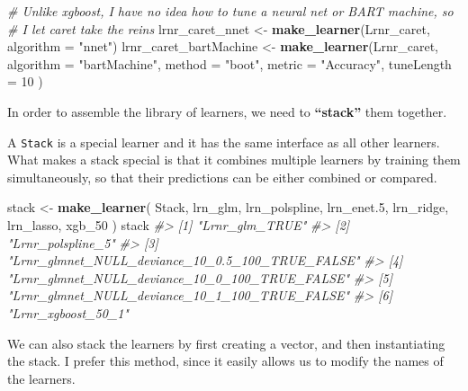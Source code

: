 \documentclass[12pt, krantz2,]{krantz}
\newenvironment{Shaded}{\begin{snugshade}}{\end{snugshade}}
\newcommand{\CommentTok}[1]{\textcolor[rgb]{0.37,0.37,0.37}{\textit{#1}}}
\newcommand{\DataTypeTok}[1]{\textcolor[rgb]{0.27,0.27,0.27}{#1}}
\newcommand{\DecValTok}[1]{\textcolor[rgb]{0.06,0.06,0.06}{#1}}
\newcommand{\FloatTok}[1]{\textcolor[rgb]{0.06,0.06,0.06}{#1}}
\newcommand{\KeywordTok}[1]{\textcolor[rgb]{0.27,0.27,0.27}{\textbf{#1}}}
\newcommand{\NormalTok}[1]{#1}
\newcommand{\StringTok}[1]{\textcolor[rgb]{0.5,0.5,0.5}{#1}}
\theoremstyle{definition}
\theoremstyle{definition}
\theoremstyle{definition}
\newcommand{\1}{\mathbbm{1}}
\begin{document}
\begin{Shaded}
\begin{Highlighting}[]
\CommentTok{# Unlike xgboost, I have no idea how to tune a neural net or BART machine, so}
\CommentTok{# I let caret take the reins}
\NormalTok{lrnr_caret_nnet <-}\StringTok{ }\KeywordTok{make_learner}\NormalTok{(Lrnr_caret, }\DataTypeTok{algorithm =} \StringTok{"nnet"}\NormalTok{)}
\NormalTok{lrnr_caret_bartMachine <-}\StringTok{ }\KeywordTok{make_learner}\NormalTok{(Lrnr_caret,}
  \DataTypeTok{algorithm =} \StringTok{"bartMachine"}\NormalTok{,}
  \DataTypeTok{method =} \StringTok{"boot"}\NormalTok{, }\DataTypeTok{metric =} \StringTok{"Accuracy"}\NormalTok{,}
  \DataTypeTok{tuneLength =} \DecValTok{10}
\NormalTok{)}
\end{Highlighting}
\end{Shaded}

In order to assemble the library of learners, we need to \textbf{``stack''} them
together.

A \texttt{Stack} is a special learner and it has the same interface as all other
learners. What makes a stack special is that it combines multiple learners by
training them simultaneously, so that their predictions can be either combined
or compared.

\begin{Shaded}
\begin{Highlighting}[]
\NormalTok{stack <-}\StringTok{ }\KeywordTok{make_learner}\NormalTok{(}
\NormalTok{  Stack, lrn_glm, lrn_polspline, lrn_enet}\FloatTok{.5}\NormalTok{, lrn_ridge, lrn_lasso, xgb_}\DecValTok{50}
\NormalTok{)}
\NormalTok{stack}
\CommentTok{#> [1] "Lrnr_glm_TRUE"                                  }
\CommentTok{#> [2] "Lrnr_polspline_5"                               }
\CommentTok{#> [3] "Lrnr_glmnet_NULL_deviance_10_0.5_100_TRUE_FALSE"}
\CommentTok{#> [4] "Lrnr_glmnet_NULL_deviance_10_0_100_TRUE_FALSE"  }
\CommentTok{#> [5] "Lrnr_glmnet_NULL_deviance_10_1_100_TRUE_FALSE"  }
\CommentTok{#> [6] "Lrnr_xgboost_50_1"}
\end{Highlighting}
\end{Shaded}

We can also stack the learners by first creating a vector, and then
instantiating the stack. I prefer this method, since it easily allows us to
modify the names of the learners.
\end{document}
